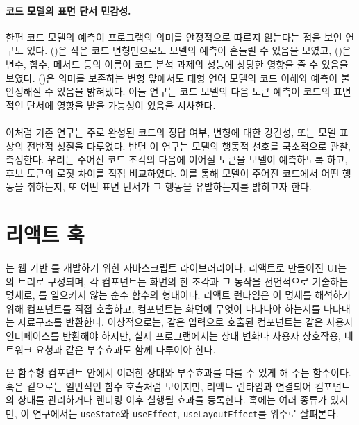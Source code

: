 \documentclass[11pt]{article}
\renewcommand{\citet}[1]{\citeauthor{#1}(\citeyear{#1})}
\begin{document}
\paragraph{코드 모델의 표면 단서 민감성.}
한편 코드 모델의 예측이 프로그램의 의미를 안정적으로 따르지 않는다는 점을 보인 연구도 있다.
\citet{yefet2020adversarial}은 작은 코드 변형만으로도 모델의 예측이 흔들릴 수 있음을 보였고, \citet{wang2024naming}은 변수, 함수, 메서드 등의 이름이 코드 분석 과제의 성능에 상당한 영향을 줄 수 있음을 보였다.
\citet{orvalho2025robust}은 의미를 보존하는 변형 앞에서도 대형 언어 모델의 코드 이해와 예측이 불안정해질 수 있음을 밝혀냈다.
이들 연구는 코드 모델의 다음 토큰 예측이 코드의 표면적인 단서에 영향을 받을 가능성이 있음을 시사한다.

\paragraph{}
이처럼 기존 연구는 주로 완성된 코드의 정답 여부, 변형에 대한 강건성, 또는 모델 표상의 전반적 성질을 다루었다.
반면 이 연구는 모델의 행동적 선호를 국소적으로 관찰, 측정한다.
우리는 주어진 코드 조각의 다음에 이어질 토큰을 모델이 예측하도록 하고, 후보 토큰의 로짓 차이를 직접 비교하였다.
이를 통해 모델이 주어진 코드에서 어떤 행동을 취하는지, 또 어떤 표면 단서가 그 행동을 유발하는지를 밝히고자 한다.

\section{리액트 훅}
\label{sec:react-hooks}

는 웹 기반 를 개발하기 위한 자바스크립트 라이브러리이다.
리액트로 만들어진 UI는 의 트리로 구성되며, 각 컴포넌트는 화면의 한 조각과 그 동작을 선언적으로 기술하는 명세로, 를 일으키지 않는 순수 함수의 형태이다.
리액트 런타임은 이 명세를 해석하기 위해 컴포넌트를 직접 호출하고, 컴포넌트는 화면에 무엇이 나타나야 하는지를 나타내는 자료구조를 반환한다.
이상적으로는, 같은 입력으로 호출된 컴포넌트는 같은 사용자 인터페이스를 반환해야 하지만, 실제 프로그램에서는 상태 변화나 사용자 상호작용, 네트워크 요청과 같은 부수효과도 함께 다루어야 한다\citep{lee2025react}.

은 함수형 컴포넌트 안에서 이러한 상태와 부수효과를 다룰 수 있게 해 주는 함수이다.
훅은 겉으로는 일반적인 함수 호출처럼 보이지만, 리액트 런타임과 연결되어 컴포넌트의 상태를 관리하거나 렌더링 이후 실행될 효과를 등록한다.
훅에는 여러 종류가 있지만, 이 연구에서는 \texttt{useState}와 \texttt{useEffect}, \texttt{useLayoutEffect}를 위주로 살펴본다.
\end{document}
